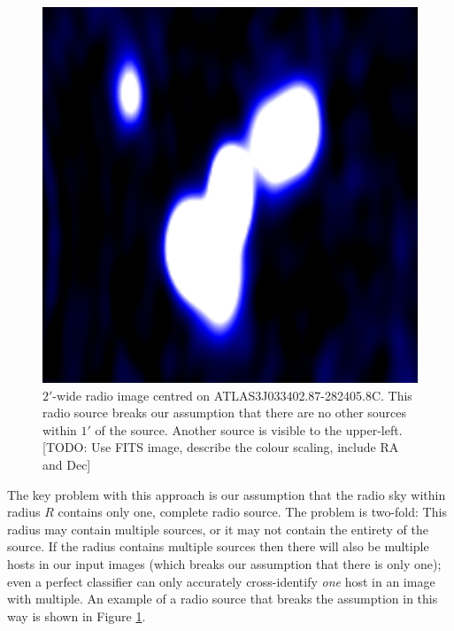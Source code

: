 \documentclass[fleqn,usenatbib,usedcolumn]{mnras}
\begin{document}
    \begin{figure}
      \centering
      \includegraphics[width=0.5\linewidth]{images/ARG0003r2v_radio.png}
      \caption{$2'$-wide radio image centred on ATLAS3\textunderscore{}J033402.87-282405.8C.
        This radio source breaks our assumption that there are
        no other sources within $1'$ of the source. Another source is
        visible to the upper-left. [TODO: Use FITS image, describe the colour scaling, include RA and Dec]}
      \label{fig:broken-isolation}
    \end{figure}

    The key problem with this approach is our assumption that the radio sky
    within radius $R$ contains only one, complete radio source. The problem is
    two-fold: This radius may contain multiple sources, or it may not contain
    the entirety of the source. If the radius contains multiple sources then
    there will also be multiple hosts in our input images (which breaks our
    assumption that there is only one); even a perfect classifier can only
    accurately cross-identify \emph{one} host in an image with multiple. An
    example of a radio source that breaks the assumption in this way is shown
    in Figure \ref{fig:broken-isolation}.
\end{document}
